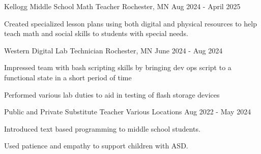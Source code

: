 

\begin{cventries}
  \cventry
    {Kellogg Middle School} %
    {Math Teacher} %
    {Rochester, MN} %
    {Aug 2024 - April 2025} %
    {
      \begin{cvitems} %
        \item {Created specialized lesson plans using both digital and physical resources to help teach math and social skills to students with special needs.}
      \end{cvitems}
    }
  \cventry
    {Western Digital} %
    {Lab Technician} %
    {Rochester, MN} %
    {June 2024 - Aug 2024} %
    {
      \begin{cvitems} %
        \item {Impressed team with bash scripting skills by bringing dev ops script to a functional state in a short period of time}
        \item {Performed various lab duties to aid in testing of flash storage devices}
      \end{cvitems}
    }

  \cventry
    {Public and Private} %
    {Substitute Teacher} %
    {Various Locations} %
    {Aug 2022 - May 2024} %
    {
      \begin{cvitems} %
        \item {Introduced text based programming to middle school students.}
        \item {Used patience and empathy to support children with ASD.}
      \end{cvitems}
    }



\end{cventries}
